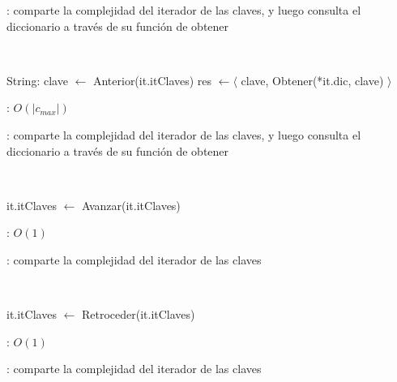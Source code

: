 \begin{Algoritmos}
	\justifcomp: comparte la complejidad del iterador de las claves, y luego consulta el diccionario a través de su función de obtener

	~

	\begin{algorithm}[H]
		\NoCaptionOfAlgo
		\caption{}
		String: clave $\leftarrow$ Anterior(it.itClaves) 
		res $\leftarrow \langle$ clave, Obtener(*it.dic, clave) $\rangle$ 
	\end{algorithm}

	\complejidad: $O(|c_{max}|)$

	\justifcomp: comparte la complejidad del iterador de las claves, y luego consulta el diccionario a través de su función de obtener

	~

	\begin{algorithm}[H]
		\NoCaptionOfAlgo
		\caption{}
		it.itClaves $\leftarrow$ Avanzar(it.itClaves) 
	\end{algorithm}

	\complejidad: $O(1)$

	\justifcomp: comparte la complejidad del iterador de las claves

	~

	\begin{algorithm}[H]
		\NoCaptionOfAlgo
		\caption{}
		it.itClaves $\leftarrow$ Retroceder(it.itClaves) 
	\end{algorithm}

	\complejidad: $O(1)$

	\justifcomp: comparte la complejidad del iterador de las claves

\end{Algoritmos}